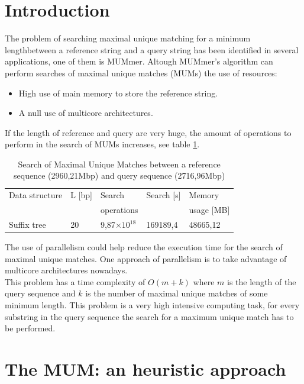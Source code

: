 \documentclass[3p,times]{elsarticle}
\providecommand{\e}[1]{\ensuremath{\times 10^{#1}}}
\begin{document}

\section{Introduction} 
\label{}
The problem of searching maximal unique matching for a minimum lengthbetween a reference
string and a query string has been
identified in several applications, one of them is MUMmer. Altough
MUMmer's algorithm can perform searches of maximal unique matches (MUMs)
the use of resources:
\begin{itemize}
  \item High use of main memory to store the reference string.
  \item A null use of multicore architectures.
\end{itemize}
If the length of reference and query are very huge, the amount of operations to perform
in the search of MUMs increases, see table \ref{tbl:operations}.
\begin{table}[ h!]
  \begin{small}
    \begin{center}
      \begin{tabular}{lllll}
        Data structure & L [bp] & Search  & Search [s] & Memory\\
        & & operations & & usage [MB]\\
        \hline
        Suffix tree & 20 & 9,87\e{18}  & 169189,4 & 48665,12\\
        \hline
      \end{tabular}
    \end{center}
  \end{small}
  \caption{Search of Maximal Unique Matches between a reference sequence (2960,21Mbp) and query sequence (2716,96Mbp)}
  \label{tbl:operations}
\end{table}
The use of parallelism could help reduce the execution time for the search of maximal unique matches. One approach of
parallelism is to take advantage of multicore architectures nowadays.\\
This problem has a time complexity of $O(m+k)$ where $m$ is the length of the query sequence and $k$ is the number of 
maximal unique matches of some minimum length. This problem is a very high intensive computing task, for every substring
in the query sequence the search for a maximum unique match has to be performed.\\ 
\section{The MUM: an heuristic approach}
\end{document}
